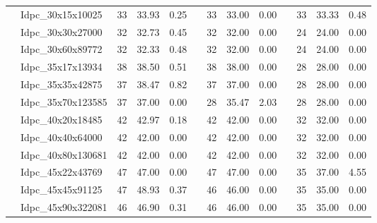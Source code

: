 \begin{table}[htbp]
{\begin{tabular}{clccccccccccc}
			& Idpc\_30x15x10025 & 33  & 33.93  & 0.25 & & 33 & 33.00 & 0.00 & & 33 & \textcolor[rgb]{ 1,  0,  0}{33.33} & 0.48 \\
			& Idpc\_30x30x27000 & 32  & 32.73  & 0.45 & & 32 & 32.00 & 0.00 & & 24 & \textcolor[rgb]{ 1,  0,  0}{24.00} & 0.00 \\
			& Idpc\_30x60x89772 & 32  & 32.33  & 0.48 & & 32 & 32.00 & 0.00 & & 24 & \textcolor[rgb]{ 1,  0,  0}{24.00} & 0.00 \\
			& Idpc\_35x17x13934 & 38  & 38.50  & 0.51 & & 38 & 38.00 & 0.00 & & 28 & \textcolor[rgb]{ 1,  0,  0}{28.00} & 0.00 \\
			& Idpc\_35x35x42875 & 37  & 38.47  & 0.82 & & 37 & 37.00 & 0.00 & & 28 & \textcolor[rgb]{ 1,  0,  0}{28.00} & 0.00 \\
			& Idpc\_35x70x123585 & 37  & 37.00  & 0.00 & & 28 & 35.47 & 2.03 & & 28 & \textcolor[rgb]{ 1,  0,  0}{28.00} & 0.00 \\
			& Idpc\_40x20x18485 & 42  & 42.97  & 0.18 & & 42 & 42.00 & 0.00 & & 32 & \textcolor[rgb]{ 1,  0,  0}{32.00} & 0.00 \\
			& Idpc\_40x40x64000 & 42  & 42.00  & 0.00 & & 42 & 42.00 & 0.00 & & 32 & \textcolor[rgb]{ 1,  0,  0}{32.00} & 0.00 \\
			& Idpc\_40x80x130681 & 42  & 42.00  & 0.00 & & 42 & 42.00 & 0.00 & & 32 & \textcolor[rgb]{ 1,  0,  0}{32.00} & 0.00 \\
			& Idpc\_45x22x43769 & 47  & 47.00  & 0.00 & & 47 & 47.00 & 0.00 & & 35 & \textcolor[rgb]{ 1,  0,  0}{37.00} & 4.55 \\
			& Idpc\_45x45x91125 & 47  & 48.93  & 0.37 & & 46 & 46.00 & 0.00 & & 35 & \textcolor[rgb]{ 1,  0,  0}{35.00} & 0.00 \\
			& Idpc\_45x90x322081 & 46  & 46.90  & 0.31 & & 46 & 46.00 & 0.00 & & 35 & \textcolor[rgb]{ 1,  0,  0}{35.00} & 0.00 \\
			\bottomrule
		\end{tabular}
	}
	\label{tab:type_1}%
\end{table}
\bigskip
\bigskip
